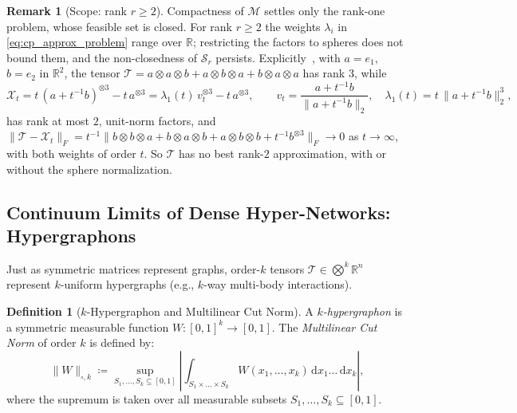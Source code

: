 \documentclass[11pt,a4paper,reqno]{amsart}
\theoremstyle{definition}
\newtheorem{definition}[theorem]{Definition}
\newtheorem{remark}[theorem]{Remark}
\numberwithin{equation}{section}
\newcommand{\R}{\mathbb{R}}
\newcommand{\dif}{\,\mathrm{d}}
\begin{document}
\begin{remark}[Scope: rank $r \ge 2$]
\label{rem:scope_rank}
Compactness of $\mathcal{M}$ settles only the rank-one problem, whose feasible set is closed. For rank $r \ge 2$ the weights $\lambda_i$ in \eqref{eq:cp_approx_problem} range over $\R$; restricting the factors to spheres does not bound them, and the non-closedness of $\mathcal{S}_r$ persists. Explicitly~\cite[Prop.~4.6]{desilva2008illposed}, with $a = e_1$, $b = e_2$ in $\R^2$, the tensor $\mathcal{T} = a\otimes a\otimes b + a\otimes b\otimes a + b\otimes a\otimes a$ has rank $3$, while
\[
\mathcal{X}_t = t\,(a + t^{-1} b)^{\otimes 3} - t\, a^{\otimes 3} = \lambda_1(t)\, v_t^{\otimes 3} - t\, a^{\otimes 3}, \qquad v_t = \frac{a + t^{-1} b}{\|a + t^{-1} b\|_2},\quad \lambda_1(t) = t\,\|a + t^{-1}b\|_2^3,
\]
has rank at most $2$, unit-norm factors, and $\|\mathcal{T} - \mathcal{X}_t\|_F = t^{-1}\|b\otimes b\otimes a + b\otimes a\otimes b + a\otimes b\otimes b + t^{-1} b^{\otimes 3}\|_F \to 0$ as $t \to \infty$, with both weights of order $t$. So $\mathcal{T}$ has no best rank-$2$ approximation, with or without the sphere normalization.
\end{remark}

\subsection{Continuum Limits of Dense Hyper-Networks: Hypergraphons}
\label{subsec:hypergraphons}

Just as symmetric matrices represent graphs, order-$k$ tensors $\mathcal{T} \in \bigotimes^k \R^n$ represent $k$-uniform hypergraphs (e.g., $k$-way multi-body interactions).

\begin{definition}[$k$-Hypergraphon and Multilinear Cut Norm]
A \emph{$k$-hypergraphon} is a symmetric measurable function $W \colon [0, 1]^k \to [0, 1]$. The \emph{Multilinear Cut Norm} of order $k$ is defined by:
\begin{equation}
    \label{eq:hypergraphon_cutnorm}
    \|W\|_{\square, k} \coloneqq \sup_{S_1, \dots, S_k \subseteq [0, 1]} \left| \int_{S_1 \times \dots \times S_k} W(x_1, \dots, x_k) \dif x_1 \dots \dif x_k \right|,
\end{equation}
where the supremum is taken over all measurable subsets $S_1, \dots, S_k \subseteq [0, 1]$.
\end{definition}
\end{document}
